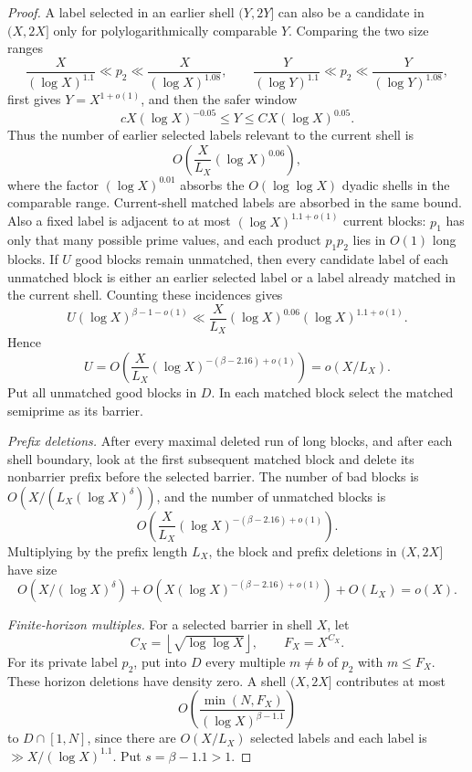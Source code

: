 \documentclass[11pt]{article}
\theoremstyle{definition}
\newcommand{\floor}[1]{\left\lfloor #1\right\rfloor}
\newcommand{\1}{\mathbf 1}
\begin{document}
\begin{proof}
A label selected in an earlier shell \((Y,2Y]\) can also be a candidate in
\((X,2X]\) only for polylogarithmically comparable \(Y\).  Comparing the two
size ranges
\[
  \frac{X}{(\log X)^{1.1}}\ll p_2\ll \frac{X}{(\log X)^{1.08}},
  \qquad
  \frac{Y}{(\log Y)^{1.1}}\ll p_2\ll \frac{Y}{(\log Y)^{1.08}},
\]
first gives \(Y=X^{1+o(1)}\), and then the safer window
\[
  cX(\log X)^{-0.05}\le Y\le C X(\log X)^{0.05}.
\]
Thus the number of earlier selected labels relevant to the current shell is
\[
  O\!\left(\frac{X}{L_X}(\log X)^{0.06}\right),
\]
where the factor \((\log X)^{0.01}\) absorbs the \(O(\log\log X)\) dyadic
shells in the comparable range.  Current-shell matched labels are absorbed in
the same bound.  Also a fixed label is adjacent to at most
\((\log X)^{1.1+o(1)}\) current blocks: \(p_1\) has only that many possible
prime values, and each product \(p_1p_2\) lies in \(O(1)\) long blocks.  If
\(U\) good blocks remain unmatched, then every candidate label of each
unmatched block is either an earlier selected label or a label already matched
in the current shell.  Counting these incidences gives
\[
  U(\log X)^{\beta-1-o(1)}
  \ll \frac{X}{L_X}(\log X)^{0.06}(\log X)^{1.1+o(1)}.
\]
Hence
\[
  U=O\!\left(\frac{X}{L_X}
  (\log X)^{-(\beta-2.16)+o(1)}\right)=o(X/L_X).
\]
Put all unmatched good blocks in \(D\).  In each matched block select the
matched semiprime as its barrier.

\smallskip
\noindent\emph{Prefix deletions.}
After every maximal deleted run of long blocks, and after each shell boundary,
look at the first subsequent matched block and delete its nonbarrier prefix
before the selected barrier.  The number of bad blocks is
\(O(X/(L_X(\log X)^\delta))\), and the number of unmatched blocks is
\[
  O\!\left(\frac{X}{L_X}
  (\log X)^{-(\beta-2.16)+o(1)}\right).
\]
Multiplying by the prefix length \(L_X\), the block and prefix deletions in
\((X,2X]\) have size
\[
  O(X/(\log X)^\delta)
  +O\!\left(X(\log X)^{-(\beta-2.16)+o(1)}\right)
  +O(L_X)=o(X).
\]

\smallskip
\noindent\emph{Finite-horizon multiples.}
For a selected barrier in shell \(X\), let
\[
  C_X=\floor{\sqrt{\log\log X}},\qquad F_X=X^{C_X}.
\]
For its private label \(p_2\), put into \(D\) every multiple
\(m\ne b\) of \(p_2\) with \(m\le F_X\).  These horizon deletions have density
zero.  A shell \((X,2X]\) contributes at most
\[
  O\!\left(\frac{\min(N,F_X)}{(\log X)^{\beta-1.1}}\right)
\]
to \(D\cap[1,N]\), since there are \(O(X/L_X)\) selected labels and each
label is \(\gg X/(\log X)^{1.1}\).  Put \(s=\beta-1.1>1\).


\end{proof}
\end{document}
